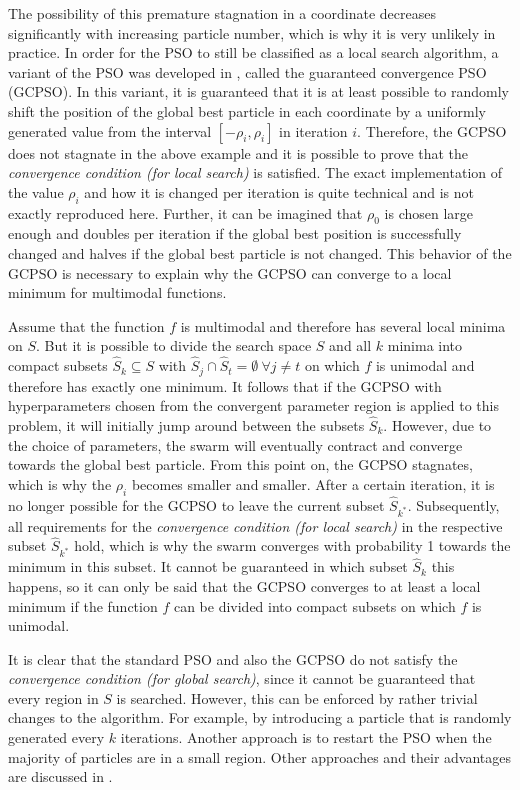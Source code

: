 \documentclass[
  oneside, a4paper, 12pt, openany]{book}
\theoremstyle{definition}
\theoremstyle{definition}
\theoremstyle{definition}
\theoremstyle{definition}
\theoremstyle{remark}
\begin{document}
The possibility of this premature stagnation in a coordinate decreases significantly with increasing particle number, which is why it is very unlikely in practice. In order for the PSO to still be classified as a local search algorithm, a variant of the PSO was developed in \citep{FbEn2010}, called the guaranteed convergence PSO (GCPSO). In this variant, it is guaranteed that it is at least possible to randomly shift the position of the global best particle in each coordinate by a uniformly generated value from the interval \([-\rho_i, \rho_i]\) in iteration \(i\). Therefore, the GCPSO does not stagnate in the above example and it is possible to prove that the \emph{convergence condition (for local search)} is satisfied. The exact implementation of the value \(\rho_i\) and how it is changed per iteration is quite technical and is not exactly reproduced here. Further, it can be imagined that \(\rho_0\) is chosen large enough and doubles per iteration if the global best position is successfully changed and halves if the global best particle is not changed. This behavior of the GCPSO is necessary to explain why the GCPSO can converge to a local minimum for multimodal functions.

Assume that the function \(f\) is multimodal and therefore has several local minima on \(S\). But it is possible to divide the search space \(S\) and all \(k\) minima into compact subsets \(\hat{S}_k \subseteq S\) with \(\hat{S}_j \cap \hat{S}_t = \emptyset \ \forall j\neq t\) on which \(f\) is unimodal and therefore has exactly one minimum. It follows that if the GCPSO with hyperparameters chosen from the convergent parameter region is applied to this problem, it will initially jump around between the subsets \(\hat{S}_k\). However, due to the choice of parameters, the swarm will eventually contract and converge towards the global best particle. From this point on, the GCPSO stagnates, which is why the \(\rho_i\) becomes smaller and smaller. After a certain iteration, it is no longer possible for the GCPSO to leave the current subset \(\hat{S}_{k^*}\). Subsequently, all requirements for the \emph{convergence condition (for local search)} in the respective subset \(\hat{S}_{k^*}\) hold, which is why the swarm converges with probability 1 towards the minimum in this subset. It cannot be guaranteed in which subset \(\hat{S}_k\) this happens, so it can only be said that the GCPSO converges to at least a local minimum if the function \(f\) can be divided into compact subsets on which \(f\) is unimodal.

It is clear that the standard PSO and also the GCPSO do not satisfy the \emph{convergence condition (for global search)}, since it cannot be guaranteed that every region in \(S\) is searched. However, this can be enforced by rather trivial changes to the algorithm. For example, by introducing a particle that is randomly generated every \(k\) iterations. Another approach is to restart the PSO when the majority of particles are in a small region. Other approaches and their advantages are discussed in \citep{FbEn2010}.
\end{document}

